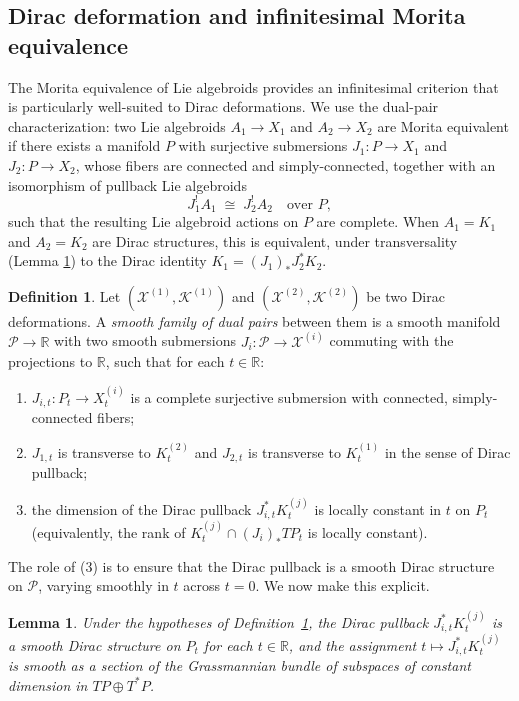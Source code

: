 \documentclass[reqno]{amsart}
\theoremstyle{plain}
\newtheorem{Lem}[Thm]{Lemma}
\theoremstyle{definition}
\newtheorem{Def}[Thm]{Definition}
\newcommand{\R}{\mathbb{R}}
\newcommand{\X}{\mathcal{X}}
\newcommand{\K}{\mathcal{K}}
\newcommand{\PP}{\mathcal{P}}
\begin{document}
\subsection{Dirac deformation and infinitesimal Morita equivalence}

The Morita equivalence of Lie algebroids provides an infinitesimal criterion that is particularly well-suited to Dirac deformations. We use the dual-pair characterization: two Lie algebroids $A_1 \to X_1$ and $A_2 \to X_2$ are Morita equivalent if there exists a manifold $P$ with surjective submersions $J_1 \colon P \to X_1$ and $J_2 \colon P \to X_2$, whose fibers are connected and simply-connected, together with an isomorphism of pullback Lie algebroids $$J_1^! A_1 \;\cong\; J_2^! A_2 \quad \text{over } P,$$ such that the resulting Lie algebroid actions on $P$ are complete. When $A_1 = K_1$ and $A_2 = K_2$ are Dirac structures, this is equivalent, under transversality (Lemma \ref{lem:smooth-pullback}) to the Dirac identity $K_1 = (J_1)_{*}J^{*}_{2}K_2.$

 
\begin{Def}\label{def:family-dual}
Let $(\X^{(1)}, \K^{(1)})$ and $(\X^{(2)}, \K^{(2)})$ be two Dirac deformations. A \emph{smooth family of dual pairs} between them is a smooth manifold $\PP \to \R$ with two smooth submersions $J_i \colon \PP \to \X^{(i)}$ commuting with the projections to $\R$, such that for each $t \in \R$:
\begin{enumerate}
  \item $J_{i,t} \colon P_t \to X_t^{(i)}$ is a complete surjective submersion with connected, simply-connected fibers;
  \item $J_{1,t}$ is transverse to $K_t^{(2)}$ and $J_{2,t}$ is transverse to $K_t^{(1)}$ in the sense of Dirac pullback;
  \item the dimension of the Dirac pullback $J_{i,t}^* K_t^{(j)}$ is locally constant in $t$ on $P_t$ (equivalently, the rank of $K_t^{(j)} \cap (J_i)_* TP_t$ is locally constant).
\end{enumerate}
\end{Def}
 
The role of (3) is to ensure that the Dirac pullback is a smooth Dirac structure on $\PP$, varying smoothly in $t$ across $t = 0$. We now make this explicit.
 
\begin{Lem}\label{lem:smooth-pullback}
Under the hypotheses of Definition~\ref{def:family-dual}, the Dirac pullback $J_{i,t}^* K_t^{(j)}$ is a smooth Dirac structure on $P_t$ for each $t \in \R$, and the assignment $t \mapsto J_{i,t}^* K_t^{(j)}$ is smooth as a section of the Grassmannian bundle of subspaces of constant dimension in $TP \oplus T^*P$.
\end{Lem}
 
\end{document}
